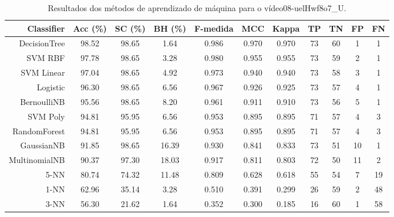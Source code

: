 \begin{table}[!htb]
\centering
\caption{Resultados dos métodos de aprendizado de máquina para o vídeo08-uelHwf8o7_U.}
\label{tab:08-uelHwf8o7_U}
\begin{tabular}{r|c|c|c|c|c|c|c|c|c|c}
\hline\hline
Classifier & Acc (\%) & SC (\%) & BH (\%) & F-medida & MCC & Kappa & TP & TN & FP & FN \\ \hline
DecisionTree & 98.52 & 98.65 & 1.64 & 0.986 & 0.970 & 0.970 & 73 & 60 & 1 & 1 \\ 
SVM RBF & 97.78 & 98.65 & 3.28 & 0.980 & 0.955 & 0.955 & 73 & 59 & 2 & 1 \\ 
SVM Linear & 97.04 & 98.65 & 4.92 & 0.973 & 0.940 & 0.940 & 73 & 58 & 3 & 1 \\ 
Logistic & 96.30 & 98.65 & 6.56 & 0.967 & 0.926 & 0.925 & 73 & 57 & 4 & 1 \\ 
BernoulliNB & 95.56 & 98.65 & 8.20 & 0.961 & 0.911 & 0.910 & 73 & 56 & 5 & 1 \\ 
SVM Poly & 94.81 & 95.95 & 6.56 & 0.953 & 0.895 & 0.895 & 71 & 57 & 4 & 3 \\ 
RandomForest & 94.81 & 95.95 & 6.56 & 0.953 & 0.895 & 0.895 & 71 & 57 & 4 & 3 \\ 
GaussianNB & 91.85 & 98.65 & 16.39 & 0.930 & 0.841 & 0.833 & 73 & 51 & 10 & 1 \\ 
MultinomialNB & 90.37 & 97.30 & 18.03 & 0.917 & 0.811 & 0.803 & 72 & 50 & 11 & 2 \\ 
5-NN & 80.74 & 74.32 & 11.48 & 0.809 & 0.628 & 0.618 & 55 & 54 & 7 & 19 \\ 
1-NN & 62.96 & 35.14 & 3.28 & 0.510 & 0.391 & 0.299 & 26 & 59 & 2 & 48 \\ 
3-NN & 56.30 & 21.62 & 1.64 & 0.352 & 0.300 & 0.185 & 16 & 60 & 1 & 58 \\ 
\hline\hline
\end{tabular}
\end{table}
